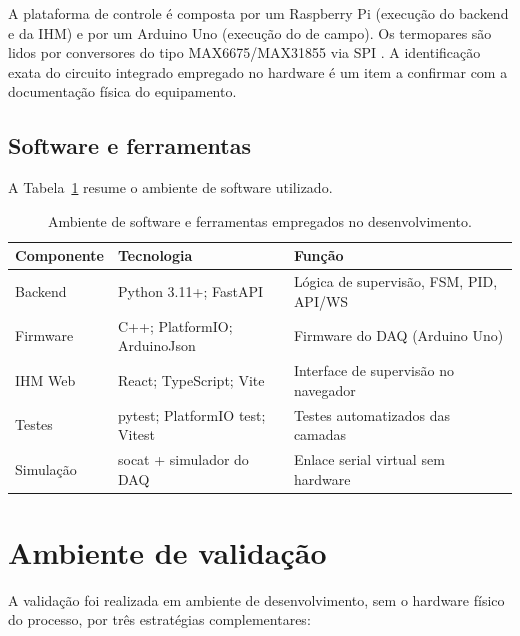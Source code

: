 A plataforma de controle \'e composta por um Raspberry Pi (execu\c{c}\~ao do
backend e da IHM) e por um Arduino Uno (execu\c{c}\~ao do \daq de campo). Os
termopares s\~ao lidos por conversores do tipo MAX6675/MAX31855 via SPI
\cite{max6675}. A identifica\c{c}\~ao exata do circuito integrado empregado no
hardware \'e um item a confirmar com a documenta\c{c}\~ao f\'isica do
equipamento.

\subsection{Software e ferramentas}

A Tabela~\ref{tab:materiais} resume o ambiente de software utilizado.

\begin{table}[htbp]
\centering
\caption{Ambiente de software e ferramentas empregados no desenvolvimento.}
\label{tab:materiais}
\begin{tabular}{lll}
\toprule
\textbf{Componente} & \textbf{Tecnologia} & \textbf{Função} \\
\midrule
Backend & Python 3.11+; FastAPI & Lógica de supervisão, FSM, PID, API/WS \\
Firmware & C++; PlatformIO; ArduinoJson & Firmware do DAQ (Arduino Uno) \\
IHM Web & React; TypeScript; Vite & Interface de supervisão no navegador \\
Testes & pytest; PlatformIO test; Vitest & Testes automatizados das camadas \\
Simulação & socat + simulador do DAQ & Enlace serial virtual sem hardware \\
\bottomrule
\end{tabular}
\par{}
\end{table}

\section{Ambiente de valida\c{c}\~ao}

A valida\c{c}\~ao foi realizada em ambiente de desenvolvimento, sem o hardware
f\'isico do processo, por tr\^es estrat\'egias complementares:

